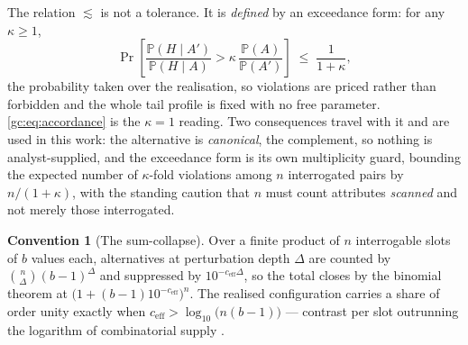 \documentclass[11pt]{article}
\numberwithin{equation}{section}
\theoremstyle{plain}
\theoremstyle{definition}
\newtheorem{convention}[theorem]{Convention}
\theoremstyle{remark}
\newcommand{\PP}{\mathbb{P}}
\begin{document}
The relation $\lesssim$ is not a tolerance. It is \emph{defined} by an
exceedance form: for any $\kappa\ge1$,
\begin{equation}\label{gc:eq:accordexceed}
\Pr\left[\frac{\PP(H\mid A')}{\PP(H\mid A)}>
\kappa\,\frac{\PP(A)}{\PP(A')}\right]\;\le\;\frac{1}{1+\kappa},
\end{equation}
the probability taken over the realisation, so violations are priced
rather than forbidden and the whole tail profile is fixed with no free
parameter. \eqref{gc:eq:accordance} is the $\kappa=1$ reading. Two
consequences travel with it and are used in this work: the alternative
is \emph{canonical}, the complement, so nothing is analyst-supplied, and the exceedance form is its own multiplicity guard, bounding the
expected number of $\kappa$-fold violations among $n$ interrogated pairs
by $n/(1+\kappa)$, with the standing caution that $n$ must count
attributes \emph{scanned} and not merely those interrogated.

\begin{convention}[The sum-collapse]\label{gc:conv:collapse}
Over a finite product of $n$ interrogable slots of $b$ values each,
alternatives at perturbation depth $\Delta$ are counted by
$\binom{n}{\Delta}(b-1)^{\Delta}$ and suppressed by
$10^{-c_{\mathrm{eff}}\Delta}$, so the total closes by the binomial
theorem at $\bigl(1+(b-1)10^{-c_{\mathrm{eff}}}\bigr)^{n}$. The realised
configuration carries a share of order unity exactly when
$c_{\mathrm{eff}}>\log_{10}\bigl(n(b-1)\bigr)$ --- contrast per slot
outrunning the logarithm of combinatorial supply \cite{Ben26Optimal}.
\end{convention}
\end{document}
